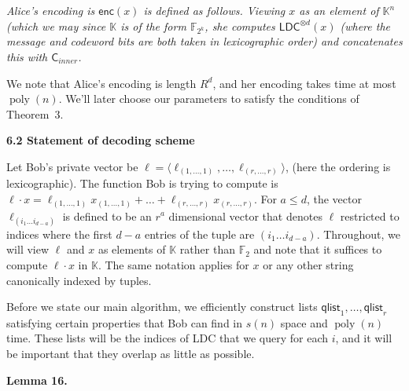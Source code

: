 \emph{Alice’s encoding is $\mathsf{enc}(x)$ is defined as follows. Viewing $x$ as an element of $\mathbb{K}^{n}$ (which we may since $\mathbb{K}$ is of the form $\mathbb{F}_{2^{k}}$, she computes $\mathsf{LDC}^{\otimes d}(x)$ (where the message and codeword bits are both taken in lexicographic order) and concatenates this with $\mathsf{C}_{inner}$.}\par






We note that Alice’s encoding is length $R^{d}$, and her encoding takes time at most $\operatorname{poly}(n)$. We’ll later choose our parameters to satisfy the conditions of Theorem 3.\par





\par\medskip\noindent\textbf{
6.2 Statement of decoding scheme}\par




Let Bob’s private vector be $\ell=\langle\ell_{(1,\ldots,1)},\ldots,\ell_{(r,\ldots,r)}\rangle$, (here the ordering is lexicographic). The function Bob is trying to compute is $\ell\cdot x=\ell_{(1,\ldots,1)}x_{(1,\ldots,1)}+\ldots+\ell_{(r,\ldots,r)}x_{(r,\ldots,r)}$. For $a\leq d$, the vector $\ell_{(i_{1}\ldots i_{d-a})}$ is defined to be an $r^{a}$ dimensional vector that denotes $\ell$ restricted to indices where the first $d-a$ entries of the tuple are $(i_{1}\ldots i_{d-a})$. Throughout, we will view $\ell$ and $x$ as elements of $\mathbb{K}$ rather than $\mathbb{F}_{2}$ and note that it suffices to compute $\ell\cdot x$ in $\mathbb{K}$.
The same notation applies for $x$ or any other string canonically indexed by tuples.\par




Before we state our main algorithm, we efficiently construct lists $\mathsf{qlist}_{1},\ldots,\mathsf{qlist}_{r}$ satisfying certain properties that Bob can find in $s(n)$ space and $\operatorname{poly}(n)$ time. These lists will be the indices of LDC that we query for each $i$, and it will be important that they overlap as little as possible.\par





\par\medskip\noindent\textbf{
\textbf{Lemma 16}\textbf{.}
}\par



